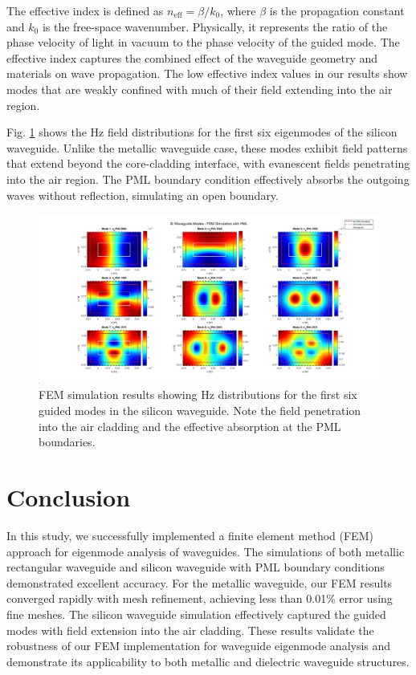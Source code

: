 \documentclass[10pt,letterpaper]{article}
\begin{document}
The effective index is defined as $n_{\text{eff}} = \beta/k_0$, 
where $\beta$ is the propagation constant and $k_0$ is 
the free-space wavenumber. Physically, 
it represents the ratio of the phase velocity of light in vacuum 
to the phase velocity of the guided mode. 
The effective index captures the combined effect of the waveguide
 geometry and materials on wave propagation. 
 The low effective index values in our results 
 show modes that are weakly confined with 
 much of their field extending into the air region.

Fig. \ref{fig:si_modes} shows the Hz field distributions for the first six eigenmodes of the silicon waveguide. Unlike the metallic waveguide case, these modes exhibit field patterns that extend beyond the core-cladding interface, with evanescent fields penetrating into the air region. The PML boundary condition effectively absorbs the outgoing waves without reflection, simulating an open boundary.

\begin{figure}[htbp]
    \centering
    \includegraphics[width=1\linewidth]{3.jpg}
    \caption{FEM simulation results showing Hz distributions for the first six guided modes in the silicon waveguide. Note the field penetration into the air cladding and the effective absorption at the PML boundaries.}
    \label{fig:si_modes}
\end{figure}

\section*{Conclusion}
In this study, we successfully implemented a finite element method (FEM) approach for eigenmode analysis of waveguides. The simulations of both metallic rectangular waveguide and silicon waveguide with PML boundary conditions demonstrated excellent accuracy. For the metallic waveguide, our FEM results converged rapidly with mesh refinement, 
achieving less than 0.01\% error using fine meshes. The silicon waveguide simulation effectively captured the guided modes with field extension into the air cladding. These results validate the robustness of our FEM implementation for waveguide eigenmode analysis and demonstrate its applicability to both metallic and dielectric waveguide structures.
\end{document}

